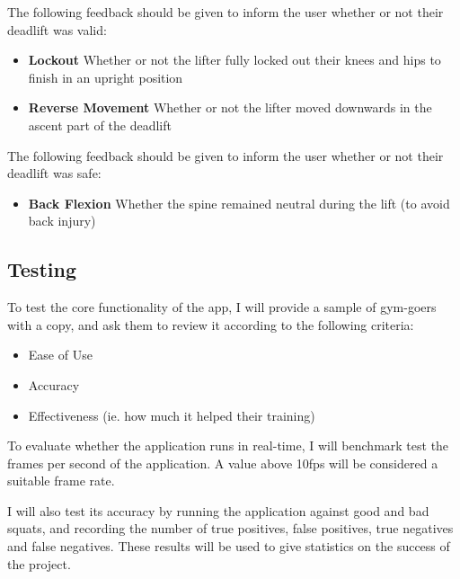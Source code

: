 The following feedback should be given to inform the user whether or not their deadlift was valid:

\begin{itemize}
	\item \textbf{Lockout} Whether or not the lifter fully locked out their knees and hips to finish in an upright position
	\item \textbf{Reverse Movement} Whether or not the lifter moved downwards in the ascent part of the deadlift
\end{itemize}

The following feedback should be given to inform the user whether or not their deadlift was safe:

\begin{itemize}
	\item \textbf{Back Flexion} Whether the spine remained neutral during the lift (to avoid back injury)
\end{itemize}

\subsection{Testing}

To test the core functionality of the app, I will provide a sample of gym-goers with a copy, and ask them to review it according to the following criteria:

\begin{itemize}
	\item Ease of Use
	\item Accuracy
	\item Effectiveness (ie. how much it helped their training)
\end{itemize}

To evaluate whether the application runs in real-time, I will benchmark test the frames per second of the application. A value above 10fps will be considered a suitable frame rate.

I will also test its accuracy by running the application against good and bad squats, and recording the number of true positives, false positives, true negatives and false negatives. These results will be used to give statistics on the success of the project.